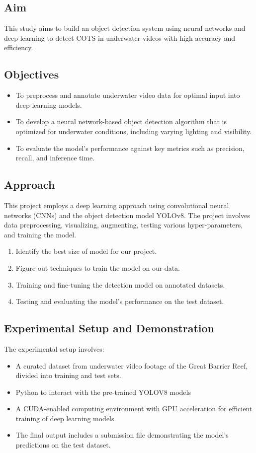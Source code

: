 \documentclass[conference]{IEEEtran}
\begin{document}
\subsection{Aim}
This study aims to build an object detection system using neural networks and deep learning to detect COTS in underwater videos with high accuracy and efficiency.

\subsection{Objectives}
\begin{itemize}
    \item To preprocess and annotate underwater video data for optimal input into deep learning models.
    \item To develop a neural network-based object detection algorithm that is optimized for underwater conditions, including varying lighting and visibility.
    \item To evaluate the model's performance against key metrics such as precision, recall, and inference time.
\end{itemize}

\subsection{Approach}
This project employs a deep learning approach using convolutional neural networks (CNNs) and the object detection model YOLOv8. The project involves data preprocessing, visualizing, augmenting, testing various hyper-parameters, and training the model.
\begin{enumerate}
    \item Identify the best size of model for our project.
    \item Figure out techniques to train the model on our data.
    \item Training and fine-tuning the detection model on annotated datasets.
    \item Testing and evaluating the model's performance on the test dataset.
\end{enumerate}

\subsection{Experimental Setup and Demonstration}
The experimental setup involves:
\begin{itemize}
    \item A curated dataset from underwater video footage of the Great Barrier Reef, divided into training and test sets.
    \item Python to interact with the pre-trained YOLOV8 models
    \item A CUDA-enabled computing environment with GPU acceleration for efficient training of deep learning models.
    \item The final output includes a submission file demonstrating the model's predictions on the test dataset.
\end{itemize}
\end{document}
